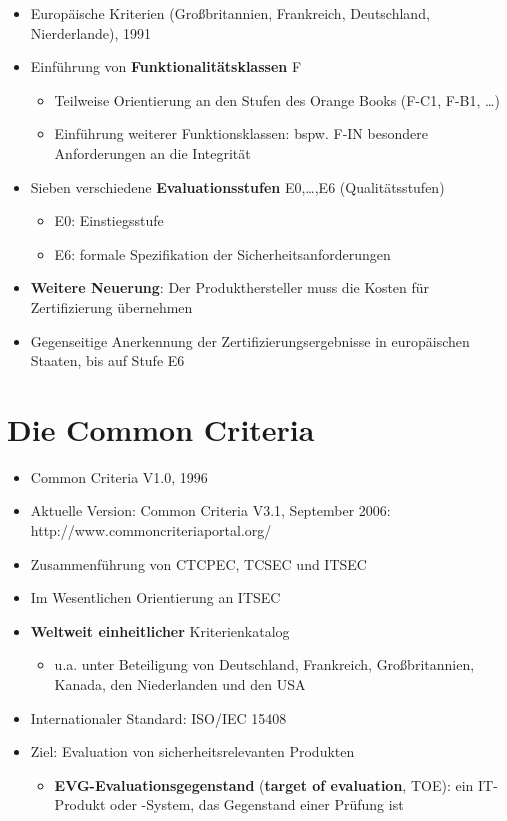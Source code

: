 \documentclass[openany]{book}
\begin{document}
\begin{itemize}
    \item Europäische Kriterien (Großbritannien, Frankreich, Deutschland, Nierderlande), 1991
    \item Einführung von \textbf{Funktionalitätsklassen} F
    \begin{itemize}
        \item Teilweise Orientierung an den Stufen des Orange Books (F-C1, F-B1, \dots)
        \item Einführung weiterer Funktionsklassen: bspw. F-IN besondere Anforderungen an die Integrität
    \end{itemize}
    \item Sieben verschiedene \textbf{Evaluationsstufen} E0,\dots,E6 (Qualitätsstufen)
    \begin{itemize}
        \item E0: Einstiegsstufe
        \item E6: formale Spezifikation der Sicherheitsanforderungen
    \end{itemize} 
    \item \textbf{Weitere Neuerung}: Der Produkthersteller muss die Kosten für Zertifizierung übernehmen
    \item Gegenseitige Anerkennung der Zertifizierungsergebnisse in europäischen Staaten, bis auf Stufe E6
\end{itemize}

\section{Die Common Criteria}

\begin{itemize}
    \item Common Criteria V1.0, 1996
    \item Aktuelle Version: Common Criteria V3.1, September 2006:  http://www.commoncriteriaportal.org/
    \item Zusammenführung von CTCPEC, TCSEC und ITSEC
    \item Im Wesentlichen Orientierung an ITSEC
    \item \textbf{Weltweit einheitlicher} Kriterienkatalog
    \begin{itemize}
        \item u.a. unter Beteiligung von Deutschland, Frankreich, Großbritannien, Kanada, den Niederlanden und den USA
    \end{itemize}
    \item Internationaler Standard: ISO/IEC 15408
    \item Ziel: Evaluation von sicherheitsrelevanten Produkten
    \begin{itemize}
        \item \textbf{EVG-Evaluationsgegenstand} (\textbf{target of evaluation}, TOE): ein IT-Produkt oder -System, das Gegenstand einer Prüfung ist
    \end{itemize}
\end{itemize}
\end{document}
